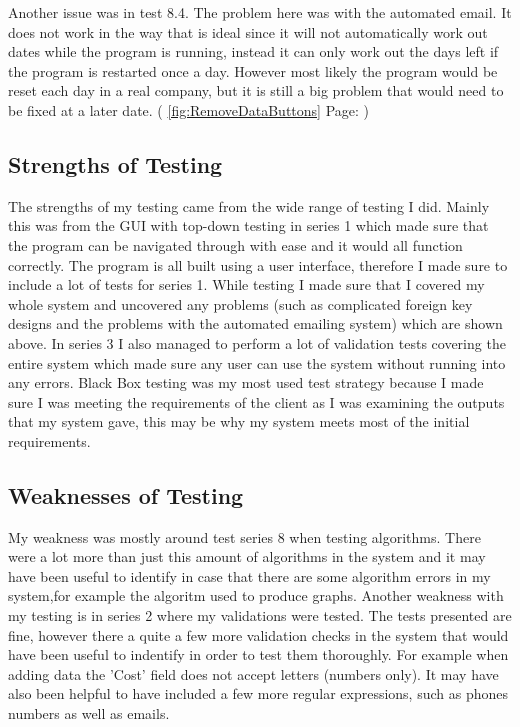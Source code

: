 \par Another issue was in test 8.4. The problem here was with the automated email. It does not work in the way that is ideal since it will not automatically work out dates while the program is running, instead it can only work out the days left if the program is restarted once a day. However most likely the program would be reset each day in a real company, but it is still a big problem that would need to be fixed at a later date. ( \ref{fig:RemoveDataButtons} Page: \pageref{fig:RemoveDataButtons})

\subsection{Strengths of Testing}

The strengths of my testing came from the wide range of testing I did. Mainly this was from the GUI with top-down testing in series 1 which made sure that the program can be navigated through with ease and it would all function correctly. The program is all built using a user interface, therefore I made sure to include a lot of tests for series 1. While testing I made sure that I covered my whole system and uncovered any problems (such as complicated foreign key designs and the problems with the automated emailing system) which are shown above. In series 3 I also managed to perform a lot of validation tests covering the entire system which made sure any user can use the system without running into any errors. Black Box testing was my most used test strategy because I made sure I was meeting the requirements of the client as I was examining the outputs that my system gave, this may be why my system meets most of the initial requirements.

\subsection{Weaknesses of Testing}

My weakness was mostly around test series 8 when testing algorithms. There were a lot more than just this amount of algorithms in the system and it may have been useful to identify in case that there are some algorithm errors in my system,for example the algoritm used to produce graphs. Another weakness with my testing is in series 2 where my validations were tested. The tests presented are fine, however there a quite a few more validation checks in the system that would have been useful to indentify in order to test them thoroughly. For example when adding data the 'Cost' field does not accept letters (numbers only). It may have also been helpful to have included a few more regular expressions, such as phones numbers as well as emails.

